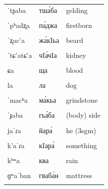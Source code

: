\documentclass[
]{article}
\begin{document}
\begin{longtable}{l|l|l}
\hline
\cellcolor{gray!6}{aˈẑa / aˈẑʷa} & \cellcolor{gray!6}{ажва́} & \cellcolor{gray!6}{word}\\
\hline
ˈtʂaba & тша́ба & gelding\\
\hline
\cellcolor{gray!6}{tʂ’a} & \cellcolor{gray!6}{шIа} & \cellcolor{gray!6}{mouth}\\
\hline
ˈpʰadʐa & па́джа & firstborn\\
\hline
\cellcolor{gray!6}{ʂaˈba} & \cellcolor{gray!6}{шаба́} & \cellcolor{gray!6}{dried-up}\\
\hline
ˈʐac’a & жа́кIьа & beard\\
\hline
\cellcolor{gray!6}{tɕaˈɾa} & \cellcolor{gray!6}{чара́} & \cellcolor{gray!6}{to eat}\\
\hline
ˈtɕ’atɕ’a & чIа́чIа & kidney\\
\hline
\cellcolor{gray!6}{ˈdʑadʑa} & \cellcolor{gray!6}{джьа́джьа} & \cellcolor{gray!6}{curly}\\
\hline
ɕa & ща & blood\\
\hline
\cellcolor{gray!6}{ʑaˈɾa} & \cellcolor{gray!6}{жьара́} & \cellcolor{gray!6}{to deceive}\\
\hline
la & ла & dog\\
\hline
\cellcolor{gray!6}{lʲaˈɡʲan} & \cellcolor{gray!6}{льагьан} & \cellcolor{gray!6}{basin}\\
\hline
ˈmacʰa & ма́кьа & grindstone\\
\hline
\cellcolor{gray!6}{ˈc’ana} & \cellcolor{gray!6}{кIьа́на} & \cellcolor{gray!6}{lump}\\
\hline
ˈɟaba & гьа́ба & (body) side\\
\hline
\cellcolor{gray!6}{ˈçapʰad} & \cellcolor{gray!6}{тлапа́д} & \cellcolor{gray!6}{stocking}\\
\hline
jaˈɾa & йара́ & he (3sgm)\\
\hline
\cellcolor{gray!6}{kʰətʰ} & \cellcolor{gray!6}{кыт} & \cellcolor{gray!6}{village}\\
\hline
k’aˈɾa & кIара́ & something\\
\hline
\cellcolor{gray!6}{ˈɡaɾa} & \cellcolor{gray!6}{га́ра} & \cellcolor{gray!6}{cradle}\\
\hline
kʰʷa & ква & rain\\
\hline
\cellcolor{gray!6}{k’ʷa} & \cellcolor{gray!6}{кIва} & \cellcolor{gray!6}{bosom}\\
\hline
ɡʷaˈban & гваба́н & mattress\\
\hline
\cellcolor{gray!6}{ˈxʷatʰa} & \cellcolor{gray!6}{хва́та} & \cellcolor{gray!6}{rug}\\

\end{longtable}
\end{document}
